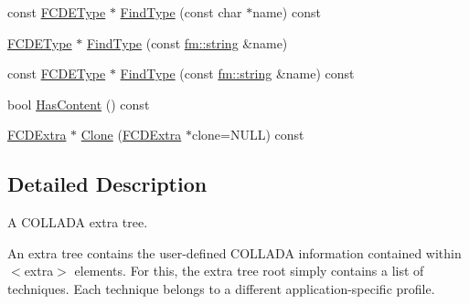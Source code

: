 \begin{DoxyCompactItemize}
const \hyperlink{classFCDEType}{FCDEType} $\ast$ \hyperlink{classFCDExtra_adf82daa2c00e8b24694dd62a23106b3f}{FindType} (const char $\ast$name) const 
\item 
\hyperlink{classFCDEType}{FCDEType} $\ast$ \hyperlink{classFCDExtra_a538c3cf6ced7df7df0f0d818292d5834}{FindType} (const \hyperlink{classfm_1_1stringT}{fm::string} \&name)
\item 
const \hyperlink{classFCDEType}{FCDEType} $\ast$ \hyperlink{classFCDExtra_a6f2d7c15d7909b0ebf4c6bccc3b9417f}{FindType} (const \hyperlink{classfm_1_1stringT}{fm::string} \&name) const 
\item 
bool \hyperlink{classFCDExtra_a08661d20edbb6cf32537f1021ce1275b}{HasContent} () const 
\item 
\hyperlink{classFCDExtra}{FCDExtra} $\ast$ \hyperlink{classFCDExtra_a0e73bed824fc3035a69bf64c351163eb}{Clone} (\hyperlink{classFCDExtra}{FCDExtra} $\ast$clone=NULL) const 
\end{DoxyCompactItemize}


\subsection{Detailed Description}
A COLLADA extra tree.

An extra tree contains the user-\/defined COLLADA information contained within $<$extra$>$ elements. For this, the extra tree root simply contains a list of techniques. Each technique belongs to a different application-\/specific profile. 


